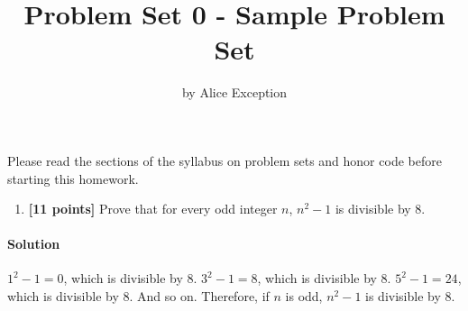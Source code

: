 \documentclass[11pt]{article}
\title{Problem Set 0 - Sample Problem Set}
\author{by Alice Exception}
\date{}
\begin{document}
\maketitle

Please read the sections of the syllabus on problem sets and honor code before starting this homework.


\begin{enumerate}
\item  \textbf{[11 points]} Prove that for every odd integer $n$, $n^2-1$ is divisible by 8. 

\end{enumerate}

{\paragraph{Solution} $1^2-1=0$, which is divisible by $8$. $3^2-1=8$, which is
divisible by $8$. $5^2-1=24$, which is divisible by $8$. And so on. Therefore, if
$n$ is odd, $n^2-1$ is divisible by $8.$ }
\end{document}
